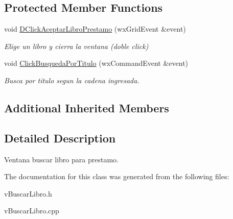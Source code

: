 \subsection*{Protected Member Functions}
\begin{DoxyCompactItemize}
\item 
void \hyperlink{classv_buscar_libro_aa002a4d4676ad63725db1bb097f1dbf8}{D\+Click\+Aceptar\+Libro\+Prestamo} (wx\+Grid\+Event \&event)\hypertarget{classv_buscar_libro_aa002a4d4676ad63725db1bb097f1dbf8}{}\label{classv_buscar_libro_aa002a4d4676ad63725db1bb097f1dbf8}

\begin{DoxyCompactList}\small\item\em Elige un libro y cierra la ventana (doble click) \end{DoxyCompactList}\item 
void \hyperlink{classv_buscar_libro_a45e99845766164470d4ab1a2ba79377f}{Click\+Busqueda\+Por\+Titulo} (wx\+Command\+Event \&event)\hypertarget{classv_buscar_libro_a45e99845766164470d4ab1a2ba79377f}{}\label{classv_buscar_libro_a45e99845766164470d4ab1a2ba79377f}

\begin{DoxyCompactList}\small\item\em Busca por titulo segun la cadena ingresada. \end{DoxyCompactList}\end{DoxyCompactItemize}
\subsection*{Additional Inherited Members}


\subsection{Detailed Description}
Ventana buscar libro para prestamo. 

The documentation for this class was generated from the following files\+:\begin{DoxyCompactItemize}
\item 
v\+Buscar\+Libro.\+h\item 
v\+Buscar\+Libro.\+cpp\end{DoxyCompactItemize}
